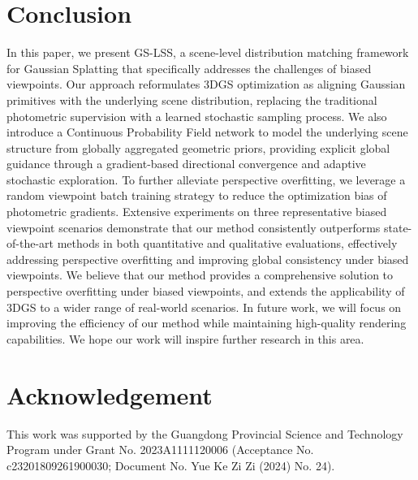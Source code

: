 \documentclass[lettersize,journal]{IEEEtran}
\begin{document}
\section{Conclusion}

In this paper, we present GS-LSS, a scene-level distribution matching framework for Gaussian Splatting that specifically addresses the challenges of biased viewpoints. Our approach reformulates 3DGS optimization as aligning Gaussian primitives with the underlying scene distribution, replacing the traditional photometric supervision with a learned stochastic sampling process. 
We also introduce a Continuous Probability Field network to model the underlying scene structure from globally aggregated geometric priors, providing explicit global guidance through a gradient-based directional convergence and adaptive stochastic exploration.
To further alleviate perspective overfitting, we leverage a random viewpoint batch training strategy to reduce the optimization bias of photometric gradients.
Extensive experiments on three representative biased viewpoint scenarios
demonstrate that our method consistently outperforms state-of-the-art methods in both quantitative and qualitative evaluations, effectively addressing perspective overfitting and improving global consistency under biased viewpoints. 
We believe that our method provides a comprehensive solution to perspective overfitting under biased viewpoints, and extends the applicability of 3DGS to a wider range of real-world scenarios. In future work, we will focus on improving the efficiency of our method while maintaining high-quality rendering capabilities. We hope our work will inspire further research in this area.


\section*{Acknowledgement}
This work was supported by the Guangdong Provincial Science and Technology Program under Grant No. 2023A1111120006 (Acceptance No. c23201809261900030; Document No. Yue Ke Zi Zi (2024) No. 24).




\vfill
\end{document}

